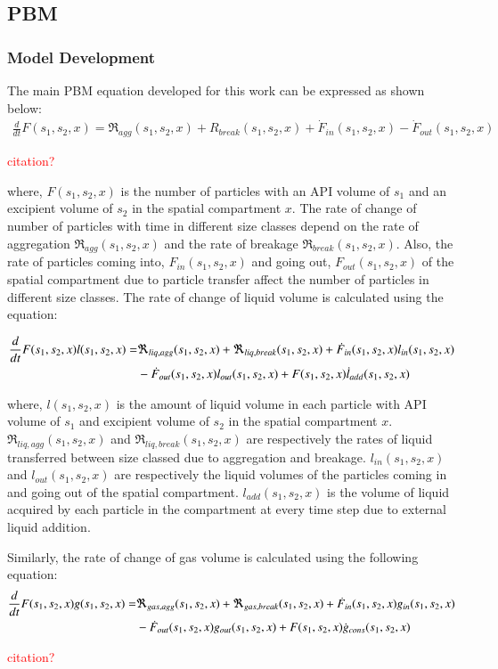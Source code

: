 \documentclass[preprint,11pt,authoryear]{elsarticle}
\begin{document}
    
  \subsection{PBM}
    \subsubsection{Model Development}
    \par The main PBM equation developed for this work can be expressed as shown below:
    \begin{align}
    \frac{d}{dt}F(s_1,s_2,x)=\Re_{agg}(s_1,s_2,x)+R_{break}(s_1,s_2,x)+\dot{F}_{in}(s_1,s_2,x)-\dot{F}_{out}(s_1,s_2,x)
    \label{eqn:mthds_pbm_overall} 
    \end{align}
    \par \textcolor{red}{citation?}    
    
    \par where, $F(s_1,s_2,x)$ is the number of particles with an API volume of $s_1$ and an excipient volume of $s_2$ in the spatial compartment $x$. The rate of change of number of particles with time in different size classes depend on the rate of aggregation $\Re_{agg}(s_1,s_2,x)$ and the rate of breakage $\Re_{break}(s_1,s_2,x)$. Also, the rate of particles coming into, $F_{in}(s_1,s_2,x)$ and going out, $F_{out}(s_1,s_2,x)$ of the spatial compartment due to particle transfer affect the number of particles in different size classes. 
The rate of change of liquid volume is calculated using the equation: 

    \begin{align}
    \frac{d}{dt}F(s_1,s_2,x)l(s_1,s_2,x)=& \Re_{liq,agg}(s_1,s_2,x)+\Re_{liq,break}(s_1,s_2,x)+\dot{F}_{in}(s_1,s_2,x)l_{in}(s_1,s_2,x)\notag\\
    &-\dot{F}_{out}(s_1,s_2,x)l_{out}(s_1,s_2,x)+F(s_1,s_2,x)\dot{l}_{add}(s_1,s_2,x)
    \end{align}
    
    \par where, $l(s_1,s_2,x)$ is the amount of liquid volume in each particle with API volume of $s_1$ and excipient volume of $s_2$ in the spatial compartment $x$. $\Re_{liq,agg}(s_1,s_2,x)$ and $\Re_{liq,break}(s_1,s_2,x)$ are respectively the rates of liquid transferred between size classed due to aggregation and breakage. $l_{in}(s_1,s_2,x)$ and $l_{out}(s_1,s_2,x)$ are respectively the liquid volumes of the particles coming in and going out of the spatial compartment. $l_{add}(s_1,s_2,x)$ is the volume of liquid acquired by each particle in the compartment at every time step due to external liquid addition. 
    \par Similarly, the rate of change of gas volume is calculated using the following equation: 
    \begin{align}
    \frac{d}{dt}F(s_1,s_2,x)g(s_1,s_2,x)=& \Re_{gas,agg}(s_1,s_2,x)+\Re_{gas,break}(s_1,s_2,x)+\dot{F}_{in}(s_1,s_2,x)g_{in}(s_1,s_2,x)\notag\\
    &-\dot{F}_{out}(s_1,s_2,x)g_{out}(s_1,s_2,x)+F(s_1,s_2,x)\dot{g}_{cons}(s_1,s_2,x)
    \end{align}
    \par \textcolor{red}{citation?}
    
\end{document}
